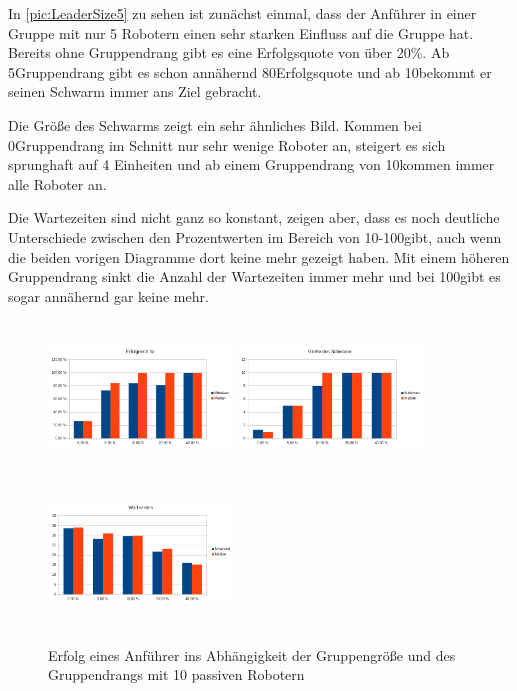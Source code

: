 In \autoref{pic:LeaderSize5} zu sehen ist zunächst einmal, dass der Anführer in einer Gruppe mit nur 5 Robotern einen sehr starken Einfluss auf die Gruppe hat. Bereits ohne Gruppendrang gibt es eine Erfolgsquote von über 20\%. Ab 5\per Gruppendrang gibt es schon annähernd 80\per Erfolgsquote und ab 10\per bekommt er seinen Schwarm immer ans Ziel gebracht.

Die Größe des Schwarms zeigt ein sehr ähnliches Bild. Kommen bei 0\per Gruppendrang im Schnitt nur sehr wenige Roboter an, steigert es sich sprunghaft auf 4 Einheiten und ab einem Gruppendrang von 10\per kommen immer alle Roboter an.

Die Wartezeiten sind nicht ganz so konstant, zeigen aber, dass es noch deutliche Unterschiede zwischen den Prozentwerten im Bereich von 10-100\per gibt, auch wenn die beiden vorigen Diagramme dort keine mehr gezeigt haben. Mit einem höheren Gruppendrang sinkt die Anzahl der Wartezeiten immer mehr und bei 100\per gibt es sogar annähernd gar keine mehr.

\begin{figure}
	\includegraphics[width=4.9cm, height=4cm]{graphics/Statistics/Leader/FlockSize/10_1.png}
	\includegraphics[width=4.9cm, height=4cm]{graphics/Statistics/Leader/FlockSize/10_2.png}
	\includegraphics[width=4.9cm, height=4cm]{graphics/Statistics/Leader/FlockSize/10_3.png}
	\caption{Erfolg eines Anführer ins Abhängigkeit der Gruppengröße und des Gruppendrangs mit 10 passiven Robotern}
	\label{pic:LeaderSize10}
\end{figure}

